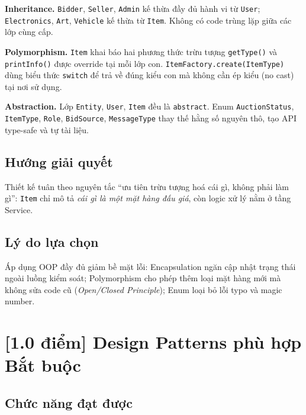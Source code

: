 \documentclass[12pt,a4paper]{article}
\newcommand{\score}[1]{\textbf{[#1 điểm]}}
\newcommand{\mandatory}{\textcolor{mandatorycolor}{\textbf{Bắt buộc}}}
\begin{document}
\textbf{Inheritance.}
\texttt{Bidder}, \texttt{Seller}, \texttt{Admin} kế thừa đầy đủ hành vi từ \texttt{User}; \texttt{Electronics}, \texttt{Art}, \texttt{Vehicle} kế thừa từ \texttt{Item}. Không có code trùng lặp giữa các lớp cùng cấp.

\textbf{Polymorphism.}
\texttt{Item} khai báo hai phương thức trừu tượng \texttt{getType()} và \texttt{printInfo()} được override tại mỗi lớp con. \texttt{ItemFactory.create(ItemType)} dùng biểu thức \texttt{switch} để trả về đúng kiểu con mà không cần ép kiểu (no cast) tại nơi sử dụng.

\textbf{Abstraction.}
Lớp \texttt{Entity}, \texttt{User}, \texttt{Item} đều là \texttt{abstract}. Enum \texttt{AuctionStatus}, \texttt{ItemType}, \texttt{Role}, \texttt{BidSource}, \texttt{MessageType} thay thế hằng số nguyên thô, tạo API type-safe và tự tài liệu.

\subsection*{Hướng giải quyết}
Thiết kế tuân theo nguyên tắc ``ưu tiên trừu tượng hoá cái gì, không phải làm gì'': \texttt{Item} chỉ mô tả \textit{cái gì là một mặt hàng đấu giá}, còn logic xử lý nằm ở tầng Service.

\subsection*{Lý do lựa chọn}
Áp dụng OOP đầy đủ giảm bề mặt lỗi: Encapsulation ngăn cập nhật trạng thái ngoài luồng kiểm soát; Polymorphism cho phép thêm loại mặt hàng mới mà không sửa code cũ (\textit{Open/Closed Principle}); Enum loại bỏ lỗi typo và magic number.

\section{\score{1.0} Design Patterns phù hợp \hfill \mandatory}

\subsection*{Chức năng đạt được}
\end{document}
